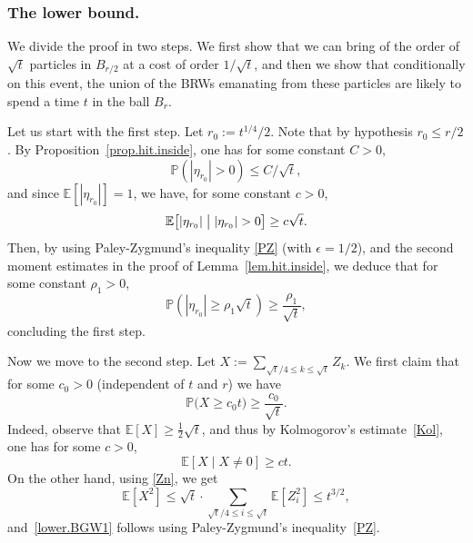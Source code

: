 \subsubsection*{The lower bound.}
We divide the proof in two steps.
We first show that we can bring of the order of $\sqrt t$
particles in $B_{r/2}$ at a cost of order $1/\sqrt t$,
and then we show that conditionally on this event, the union of the BRWs emanating from these particles are likely to spend a time $t$ in the ball $B_r$.

Let us start with the first step. Let $r_0 := t^{1/4}/2$. Note that by hypothesis $r_0 \le r/2$.
By Proposition~\ref{prop.hit.inside}, one has for some constant $C>0$,
\[
\mathbb P(|\eta_{r_0}|> 0) \le C/\sqrt t,
\]
and since $\mathbb E[|\eta_{r_0}|]=1$,
we have, for some constant $c>0$,
\[
\mathbb E\big[|\eta_{r_0}|\bigm| |\eta_{r_0}|> 0\big]\ge
c\sqrt t.
\]
Then, by using Paley-Zygmund's inequality \eqref{PZ} (with $\epsilon=1/2$),
and the second
moment estimates in the proof of Lemma~\ref{lem.hit.inside}, we deduce that for some constant $\rho_1>0$,
\begin{equation}\label{lower.1st}
\mathbb P(|\eta_{r_0}|\ge \rho_1\sqrt t) \ge \frac{\rho_1}{\sqrt t},
\end{equation}
concluding the first step.

Now we move to the second step.
Let $X:=\sum_{\sqrt t/4\le k\le {\sqrt t} } Z_k$.
We first claim that for some $c_0>0$ (independent of $t$ and $r$) we have
\begin{equation}\label{lower.BGW1}
\mathbb P\big(X \ge c_0 t\big) \ge\frac{c_0}{\sqrt t}.
\end{equation}
Indeed, observe that $\mathbb E[X] \ge \frac{1}{2}\sqrt t$, and
thus by Kolmogorov's estimate~\eqref{Kol}, one has for some $c>0$,
\[
\mathbb E[X\mid X\neq 0] \ge ct.
\]
On the other hand, using \eqref{Zn}, we get
\[
\mathbb E[X^2] \le \sqrt t\cdot
\sum_{\sqrt t/4\le i\le \sqrt t}
\mathbb E[Z_i^2] \le t^{3/2},
\]
and~\eqref{lower.BGW1} follows using Paley-Zygmund's inequality~\eqref{PZ}.

